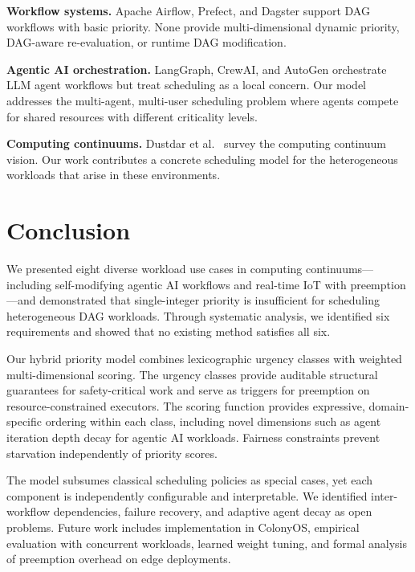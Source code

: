 \documentclass[conference]{IEEEtran}
\begin{document}
\textbf{Workflow systems.} Apache Airflow, Prefect, and Dagster support DAG workflows with basic priority. None provide multi-dimensional dynamic priority, DAG-aware re-evaluation, or runtime DAG modification.

\textbf{Agentic AI orchestration.} LangGraph, CrewAI, and AutoGen orchestrate LLM agent workflows but treat scheduling as a local concern. Our model addresses the multi-agent, multi-user scheduling problem where agents compete for shared resources with different criticality levels.

\textbf{Computing continuums.} Dustdar et al.~\cite{dustdar2023computing} survey the computing continuum vision. Our work contributes a concrete scheduling model for the heterogeneous workloads that arise in these environments.

\section{Conclusion}
\label{sec:conclusion}

We presented eight diverse workload use cases in computing continuums---including self-modifying agentic AI workflows and real-time IoT with preemption---and demonstrated that single-integer priority is insufficient for scheduling heterogeneous DAG workloads. Through systematic analysis, we identified six requirements and showed that no existing method satisfies all six.

Our hybrid priority model combines lexicographic urgency classes with weighted multi-dimensional scoring. The urgency classes provide auditable structural guarantees for safety-critical work and serve as triggers for preemption on resource-constrained executors. The scoring function provides expressive, domain-specific ordering within each class, including novel dimensions such as agent iteration depth decay for agentic AI workloads. Fairness constraints prevent starvation independently of priority scores.

The model subsumes classical scheduling policies as special cases, yet each component is independently configurable and interpretable. We identified inter-workflow dependencies, failure recovery, and adaptive agent decay as open problems. Future work includes implementation in ColonyOS, empirical evaluation with concurrent workloads, learned weight tuning, and formal analysis of preemption overhead on edge deployments.
\end{document}
